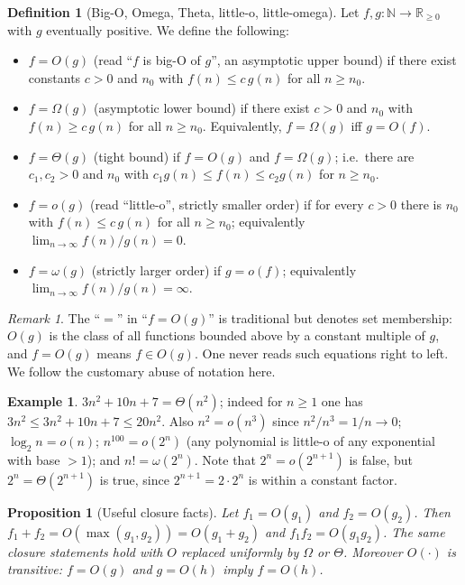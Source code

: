 \documentclass[11pt,a4paper]{article}
\newtheorem{proposition}[theorem]{Proposition}
\theoremstyle{definition}
\newtheorem{definition}[theorem]{Definition}
\newtheorem{example}[theorem]{Example}
\theoremstyle{remark}
\newtheorem{remark}[theorem]{Remark}
\newcommand{\N}{\ensuremath{\mathbb{N}}}
\newcommand{\R}{\ensuremath{\mathbb{R}}}
\begin{document}
\begin{definition}[Big-O, Omega, Theta, little-o, little-omega]\label{probability:def-asymp}
Let \(f, g\colon \N \to \R_{\ge 0}\) with \(g\) eventually positive. We define the following:
\begin{itemize}
\item \(f = O(g)\) (read ``\(f\) is big-O of \(g\)'', an asymptotic upper bound) if there exist constants \(c > 0\) and \(n_0\) with \(f(n) \le c\,g(n)\) for all \(n \ge n_0\).
\item \(f = \Omega(g)\) (asymptotic lower bound) if there exist \(c > 0\) and \(n_0\) with \(f(n) \ge c\,g(n)\) for all \(n \ge n_0\). Equivalently, \(f = \Omega(g)\) iff \(g = O(f)\).
\item \(f = \Theta(g)\) (tight bound) if \(f = O(g)\) and \(f = \Omega(g)\); i.e.\ there are \(c_1, c_2 > 0\) and \(n_0\) with \(c_1 g(n) \le f(n) \le c_2 g(n)\) for \(n \ge n_0\).
\item \(f = o(g)\) (read ``little-o'', strictly smaller order) if for every \(c > 0\) there is \(n_0\) with \(f(n) \le c\,g(n)\) for all \(n \ge n_0\); equivalently \(\lim_{n\to\infty} f(n)/g(n) = 0\).
\item \(f = \omega(g)\) (strictly larger order) if \(g = o(f)\); equivalently \(\lim_{n\to\infty} f(n)/g(n) = \infty\).
\end{itemize}
\end{definition}

\begin{remark}\label{probability:rem-asymp-eq}
The ``\(=\)'' in ``\(f = O(g)\)'' is traditional but denotes set membership: \(O(g)\) is the class of all functions bounded above by a constant multiple of \(g\), and \(f = O(g)\) means \(f \in O(g)\). One never reads such equations right to left. We follow the customary abuse of notation here.
\end{remark}

\begin{example}\label{probability:exp-asymp}
\(3n^2 + 10 n + 7 = \Theta(n^2)\); indeed for \(n \ge 1\) one has \(3n^2 \le 3n^2 + 10n + 7 \le 20 n^2\). Also \(n^2 = o(n^3)\) since \(n^2/n^3 = 1/n \to 0\); \(\log_2 n = o(n)\); \(n^{100} = o(2^n)\) (any polynomial is little-o of any exponential with base \(> 1\)); and \(n! = \omega(2^n)\). Note that \(2^{n} = o(2^{n+1})\) is false, but \(2^{n} = \Theta(2^{n+1})\) is true, since \(2^{n+1} = 2 \cdot 2^n\) is within a constant factor.
\end{example}

\begin{proposition}[Useful closure facts]\label{probability:prop-asymp-closure}
Let \(f_1 = O(g_1)\) and \(f_2 = O(g_2)\). Then \(f_1 + f_2 = O(\max(g_1, g_2)) = O(g_1 + g_2)\) and \(f_1 f_2 = O(g_1 g_2)\). The same closure statements hold with \(O\) replaced uniformly by \(\Omega\) or \(\Theta\). Moreover \(O(\cdot)\) is transitive: \(f = O(g)\) and \(g = O(h)\) imply \(f = O(h)\).
\end{proposition}
\end{document}
